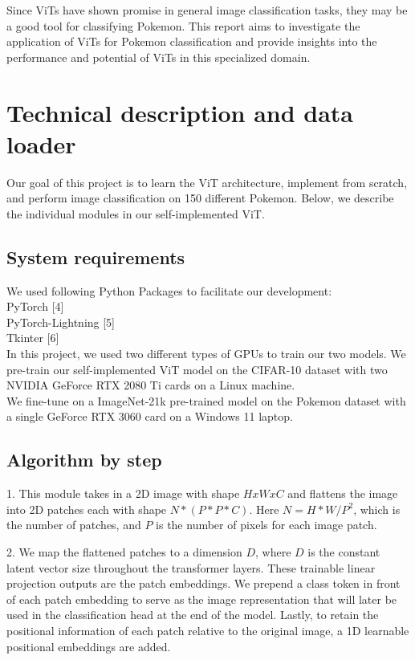 \documentclass{article} %
\begin{document}
Since ViTs have shown promise in general image classification tasks, they may be a good 
tool for classifying Pokemon. This report aims to investigate the application of ViTs for 
Pokemon classification and provide insights into the performance and potential of ViTs in 
this specialized domain.

\section{Technical description and data loader}
\label{gen_inst}

Our goal of this project is to learn the ViT architecture, implement from scratch, and
perform image classification on 150 different Pokemon. Below, we describe the individual 
modules in our self-implemented ViT.

\subsection{System requirements}
We used following Python Packages to facilitate our development: \\
PyTorch [4] \\
PyTorch-Lightning [5] \\
Tkinter [6] \\

In this project, we used two different types of GPUs to train our two models.
We pre-train our self-implemented ViT model on the CIFAR-10 dataset with two NVIDIA GeForce RTX 2080 Ti cards on a Linux machine. \\
We fine-tune on a ImageNet-21k pre-trained model on the Pokemon dataset with a single GeForce RTX 3060 card on a Windows 11 laptop.

\subsection{Algorithm by step}

1. This module takes in a 2D image with shape $HxWxC$ and flattens the image into 2D patches each with shape $N * (P * P * C)$.
Here $N = {H * W} / {P^2}$, which is the number of patches, and $P$ is the number of pixels for each image patch.

2. We map the flattened patches to a dimension $D$, where $D$ is the constant latent vector size throughout the transformer layers.
These trainable linear projection outputs are the patch embeddings.
We prepend a class token in front of each patch embedding to serve as the image representation that will later be used in the
classification head at the end of the model. Lastly, to retain the positional information of each patch relative to the original image,
a 1D learnable positional embeddings are added.
\end{document}
